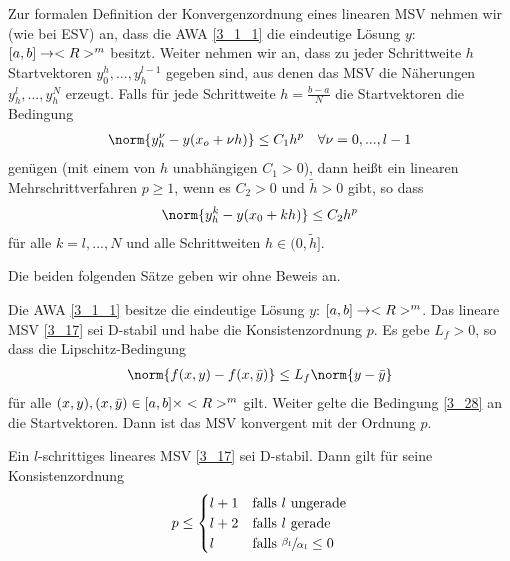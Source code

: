 Zur formalen Definition der Konvergenzordnung eines linearen MSV nehmen wir (wie bei ESV) an, dass die AWA \cref{3_1_1} die eindeutige Lösung $y$: $[a,b]\to<R>^m$ besitzt. Weiter nehmen wir an, dass zu jeder Schrittweite $h$ Startvektoren $y_0^h,...,y_h^{l-1}$ gegeben sind, aus denen das MSV die Näherungen $y_h^l,...,y_h^N$ erzeugt. Falls für jede Schrittweite $h=\frac{b-a}{N}$ die Startvektoren die Bedingung
\begin{align}
	\label{3_28}
	\norm{y_h^\nu - y(x_o+\nu h)} \le C_1h^p\quad\forall\nu=0,...,l-1
\end{align}
genügen (mit einem von $h$ unabhängigen $C_1>0$), dann heißt ein linearen Mehrschrittverfahren  $p\ge 1$, wenn es $C_2>0$ und $\tilde{h}>0$ gibt, so dass
\begin{align}
	\norm{y_h^k - y(x_0+kh)} \le C_2h^p \notag
\end{align}
für alle $k=l,...,N$ und alle Schrittweiten $h\in (0,\tilde{h}]$.

Die beiden folgenden Sätze geben wir ohne Beweis an.

\begin{proposition}
	Die AWA \cref{3_1_1} besitze die eindeutige Lösung $y$: $[a,b]\to<R>^m$. Das lineare MSV \cref{3_17} sei D-stabil und habe die Konsistenzordnung $p$. Es gebe $L_f>0$, so dass die Lipschitz-Bedingung
	\begin{align}
		\norm{f(x,y) - f(x,\bar{y})} \le L_f\norm{y-\bar{y}}\notag
	\end{align}
	für alle $(x,y),(x,\bar{y})\in [a,b]\times<R>^m$ gilt. Weiter gelte die Bedingung \cref{3_28} an die Startvektoren. Dann ist das MSV konvergent mit der Ordnung $p$.
\end{proposition}

\begin{proposition}
	Ein $l$-schrittiges lineares MSV \cref{3_17} sei D-stabil. Dann gilt für seine Konsistenzordnung
	\begin{align}
		p \le \begin{cases}
			l+1 & \text{falls } l \text{ ungerade} \\
			l+2 & \text{falls } l \text{ gerade} \\
			l & \text{falls } \sfrac{\beta_l}{\alpha_l} \le 0
		\end{cases} \notag
	\end{align}
\end{proposition}

